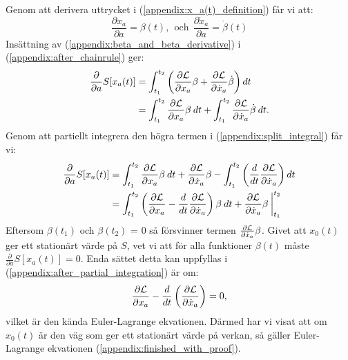     Genom att derivera uttrycket i (\ref{appendix:x_a(t)_definition}) får vi att:
    \begin{equation}
        \frac{\partial x_a}{\partial a} = \beta(t),\:\: \text{och}\:\: \frac{\partial \dot{x}_a}{\partial a} = \dot{\beta}(t) \label{appendix:beta_and_beta_derivative}
    \end{equation}
    Insättning av (\ref{appendix:beta_and_beta_derivative}) i (\ref{appendix:after_chainrule}) ger:
    \begin{align}
         \frac{\partial}{\partial a} S[x_a(t)] &= \int_{t_1}^{t_2} \left(\frac{\partial \mathcal{L}}{\partial x_a} \beta + \frac{\partial \mathcal{L}}{\partial \dot{x}_a} \dot{\beta}\right) dt \notag \\
         &= \int_{t_1}^{t_2} \frac{\partial \mathcal{L}}{\partial x_a}\beta\: dt + \int_{t_1}^{t_2} \frac{\partial \mathcal{L}}{\partial \dot{x}_a} \dot{\beta}\: dt. \label{appendix:split_integral}
    \end{align}
    Genom att partiellt integrera den högra termen i (\ref{appendix:split_integral}) får vi:
    \begin{align}
        \frac{\partial}{\partial a} S[x_a(t)] &= \int_{t_1}^{t_2} \frac{\partial \mathcal{L}}{\partial x_a}\beta\: dt + \frac{\partial \mathcal{L}}{\partial \dot{x}_a} \beta - \int_{t_1}^{t_2} \left( \frac{d}{dt} \frac{\partial \mathcal{L}}{\partial \dot{x}_a} \right) dt \notag \\
        &= \int_{t_1}^{t_2} \left( \frac{\partial \mathcal{L}}{\partial x_a} - \frac{d}{dt} \frac{\partial \mathcal{L}}{\partial \dot{x}_a} \right)\beta\: dt + \frac{\partial \mathcal{L}}{\partial \dot{x}_a} \beta\:\biggr|_{t_1}^{t_2} \label{appendix:after_partial_integration}
    \end{align}
    Eftersom $\beta(t_1)$ och $\beta(t_2)$ = 0 så försvinner termen $\frac{\partial \mathcal{L}}{\partial \dot{x}_a} \beta$. Givet att $x_0(t)$ ger ett stationärt värde på $S$, vet vi att för alla funktioner $\beta(t)$ måste $\frac{\partial}{\partial a}S[x_a(t)] = 0$. Enda sättet detta kan uppfyllas i (\ref{appendix:after_partial_integration}) är om:  
    \begin{align}
        \frac{\partial \mathcal{L}}{\partial x_a} -  \frac{d}{dt} \left( \frac{\partial \mathcal{L}}{\partial \dot{x}_a} \right) = 0, \label{appendix:finished_with_proof}
    \end{align}
    vilket är den kända Euler-Lagrange ekvationen. Därmed har vi visat att om $x_0(t)$ är den väg som ger ett stationärt värde på verkan, så gäller Euler-Lagrange ekvationen (\ref{appendix:finished_with_proof}). \QED





